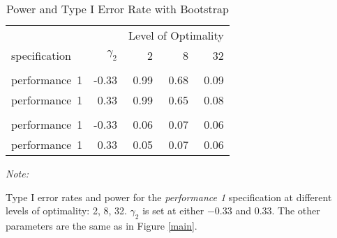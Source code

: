 \begin{table}

\caption{\label{tab:bootstrap-table}Power and Type I Error Rate with Bootstrap}
\centering
\fontsize{9}{11}\selectfont
\begin{threeparttable}
\begin{tabular}[t]{lrrrr}
\toprule
\multicolumn{1}{c}{ } & \multicolumn{1}{c}{ } & \multicolumn{3}{c}{Level of Optimality} \\
\cmidrule(l{3pt}r{3pt}){3-5}
specification & $\gamma_2$ & 2 & 8 & 32\\
\midrule
\addlinespace[0.3em]
\multicolumn{5}{c}{\textbf{Power}}\\
\hspace{1em}performance~1 & -0.33 & 0.99 & 0.68 & 0.09\\
\hspace{1em}performance~1 & 0.33 & 0.99 & 0.65 & 0.08\\
\addlinespace[0.3em]
\multicolumn{5}{c}{\textbf{Type I}}\\
\hspace{1em}performance~1 & -0.33 & 0.06 & 0.07 & 0.06\\
\hspace{1em}performance~1 & 0.33 & 0.05 & 0.07 & 0.06\\
\bottomrule
\end{tabular}
\begin{tablenotes}
\item \textit{Note: } 
\item Type I error rates and power for the 
  \emph{performance 1} specification at different levels of optimality:
  2, 8, 32. $\gamma_2$ is set at either $-0.33$ and $0.33$. 
  The other parameters are the same as in Figure \ref{main}.
\end{tablenotes}
\end{threeparttable}
\end{table}